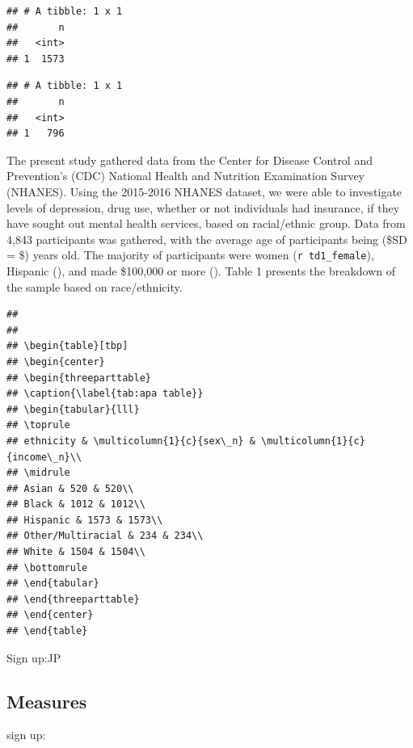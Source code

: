\documentclass[man]{apa6}
\begin{document}
\begin{verbatim}
## # A tibble: 1 x 1
##       n
##   <int>
## 1  1573
\end{verbatim}

\begin{verbatim}
## # A tibble: 1 x 1
##       n
##   <int>
## 1   796
\end{verbatim}

The present study gathered data from the Center for Disease Control and
Prevention's (CDC) National Health and Nutrition Examination Survey
(NHANES). Using the 2015-2016 NHANES dataset, we were able to
investigate levels of depression, drug use, whether or not individuals
had insurance, if they have sought out mental health services, based on
racial/ethnic group. Data from 4,843 participants was gathered, with the
average age of participants being (\$SD = \$) years old. The majority of
participants were women (\texttt{r\ td1\_female}), Hispanic (), and made
\$100,000 or more (). Table 1 presents the breakdown of the sample based
on race/ethnicity.

\begin{verbatim}
## 
## 
## \begin{table}[tbp]
## \begin{center}
## \begin{threeparttable}
## \caption{\label{tab:apa table}}
## \begin{tabular}{lll}
## \toprule
## ethnicity & \multicolumn{1}{c}{sex\_n} & \multicolumn{1}{c}{income\_n}\\
## \midrule
## Asian & 520 & 520\\
## Black & 1012 & 1012\\
## Hispanic & 1573 & 1573\\
## Other/Multiracial & 234 & 234\\
## White & 1504 & 1504\\
## \bottomrule
## \end{tabular}
## \end{threeparttable}
## \end{center}
## \end{table}
\end{verbatim}

Sign up:JP

\subsection{Measures}\label{measures}

sign up:
\end{document}

